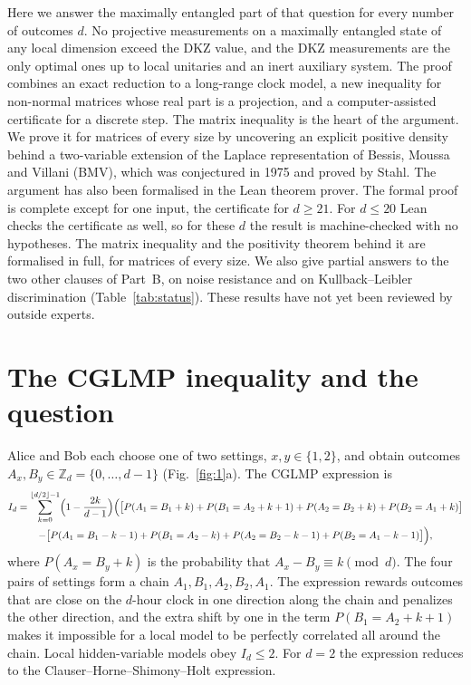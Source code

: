 \documentclass[11pt]{article}
\newcommand{\Z}{\mathbb{Z}}
\begin{document}
Here we answer the maximally entangled part of that question for every number of outcomes $d$. No projective
measurements on a maximally entangled state of any local dimension exceed the DKZ value, and the DKZ measurements are
the only optimal ones up to local unitaries and an inert auxiliary system. The proof combines an exact reduction to a
long-range clock model, a new inequality for non-normal matrices whose real part is a projection, and a
computer-assisted certificate for a discrete step. The matrix inequality is the heart of the argument. We prove it for
matrices of every size by uncovering an explicit positive density behind a two-variable extension of the Laplace
representation of Bessis, Moussa and Villani (BMV), which was conjectured in 1975 and proved by Stahl\cite{BMV1975,
Stahl2013}. The argument has also been formalised in the Lean theorem prover\cite{Lean2021,Mathlib2020}. The formal
proof is complete except for one input, the certificate for $d\ge21$. For $d\le20$ Lean checks the certificate
as well, so for these $d$ the result is machine-checked with no hypotheses. The matrix inequality and the positivity
theorem behind it are formalised in full, for matrices of every size. We also give partial answers to the two other
clauses of Part~B, on noise resistance and on Kullback--Leibler discrimination (Table~\ref{tab:status}). These results
have not yet been reviewed by outside experts.

\section*{The CGLMP inequality and the question}

Alice and Bob each choose one of two settings, $x,y\in\{1,2\}$, and obtain outcomes $A_x,B_y\in\Z_d=\{0,\dots,d-1\}$
(Fig.~\ref{fig:1}a). The CGLMP expression is\cite{CGLMP2002}
\begin{multline}\label{eq:cglmp}
I_d=\sum_{k=0}^{\lfloor d/2\rfloor-1}\Bigl(1-\frac{2k}{d-1}\Bigr)\Bigl(\bigl[P(A_1=B_1+k)+P(B_1=A_2+k+1)
+P(A_2=B_2+k)+P(B_2=A_1+k)\bigr]\\
-\bigl[P(A_1=B_1-k-1)+P(B_1=A_2-k)+P(A_2=B_2-k-1)+P(B_2=A_1-k-1)\bigr]\Bigr),
\end{multline}
where $P(A_x=B_y+k)$ is the probability that $A_x-B_y\equiv k\pmod d$. The four pairs of settings form a chain
$A_1,B_1,A_2,B_2,A_1$. The expression rewards outcomes that are close on the $d$-hour clock in one direction
along the chain and penalizes the other direction, and the extra shift by one in the term $P(B_1=A_2+k+1)$ makes it
impossible for a local model to be perfectly correlated all around the chain. Local hidden-variable models obey
$I_d\le2$\cite{CGLMP2002}. For $d=2$ the expression reduces to the Clauser--Horne--Shimony--Holt expression.
\end{document}
